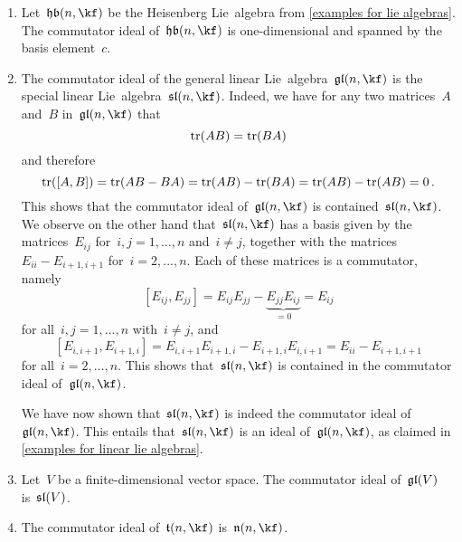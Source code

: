 \begin{example}
	\label{examples of commutator ideals}
	\leavevmode
	\begin{enumerate}
		\item
			Let~$\heisenberglie(n, \kf)$ be the Heisenberg Lie~algebra from \cref{examples for lie algebras}.
			The commutator ideal of~$\heisenberglie(n, \kf)$ is one-dimensional and spanned by the basis element~$c$.
		\item
			The commutator ideal of the general linear Lie~algebra~$\gllie(n, \kf)$ is the special linear Lie~algebra~$\sllie(n, \kf)$.
			Indeed, we have for any two matrices~$A$ and~$B$ in~$\gllie(n, \kf)$ that
			\[
				\operatorname{tr}(AB) = \operatorname{tr}(BA)
			\]
			and therefore
			\[
					\operatorname{tr}( [A,B] )
				= \operatorname{tr}(AB-BA)
				= \operatorname{tr}(AB) - \operatorname{tr}(BA)
				= \operatorname{tr}(AB) - \operatorname{tr}(AB)
				= 0  \,.
			\]
			This shows that the commutator ideal of~$\gllie(n, \kf)$ is contained~$\sllie(n, \kf)$.
			We observe on the other hand that~$\sllie(n, \kf)$ has a basis given by the matrices~$E_{ij}$ for~$i,j = 1, \dotsc, n$ and~$i \neq j$, together with the matrices~$E_{ii} - E_{i+1,i+1}$ for~$i = 2, \dotsc, n$.
			Each of these matrices is a commutator, namely
			\[
				[E_{ij}, E_{jj}]
				=
				E_{ij} E_{jj} - \underbrace{ E_{jj} E_{ij} }_{=0}
				=
				E_{ij}
			\]
			for all~$i, j = 1, \dotsc, n$ with~$i \neq j$, and
			\[
				[E_{i,i+1}, E_{i+1,i}]
				=
				E_{i,i+1} E_{i+1,i} - E_{i+1,i} E_{i,i+1}
				=
				E_{ii} - E_{i+1,i+1}
			\]
			for all~$i = 2, \dotsc, n$.
			This shows that~$\sllie(n, \kf)$ is contained in the commutator ideal of~$\gllie(n, \kf)$.

			We have now shown that~$\sllie(n, \kf)$ is indeed the commutator ideal of~$\gllie(n, \kf)$.
			This entails that~$\sllie(n, \kf)$ is an ideal of~$\gllie(n, \kf)$, as claimed in \cref{examples for linear lie algebras}.
		\item
			Let~$V$ be a finite-dimensional vector space.
			The commutator ideal of~$\mathfrak{gl}(V)$ is~$\mathfrak{sl}(V)$.
		\item
			The commutator ideal of~$\trianglie(n, \kf)$ is~$\upperlie(n, \kf)$.
		

\end{enumerate}
\end{example}
